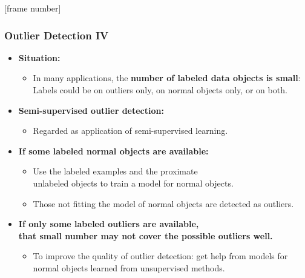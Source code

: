 \documentclass[aspectratio=169,t,xcolor=dvipsnames]{beamer}
\begin{document}
{
[frame number]
\begin{frame}
	\frametitle{Outlier Detection IV}
	\begin{itemize}
		\item \textbf{Situation:}
		      \begin{itemize}
		      	\item In many applications, the \textbf{\color{airforceblue}number of labeled data objects is small}:\\
            Labels could be on outliers only, on normal objects only, or on both.
		      \end{itemize}
		\item \textbf{Semi-supervised outlier detection:}
		      \begin{itemize}
		      	\item Regarded as application of semi-supervised learning.
		      \end{itemize}
		\item \textbf{If some {\color{airforceblue}labeled normal objects} are available:}
		      \begin{itemize}
		      	\item Use the labeled examples and the proximate \\
            unlabeled objects to train a model for normal objects.
		      	\item Those not fitting the model of normal objects are detected as outliers.
		      \end{itemize}
		\item \textbf{If only some {\color{airforceblue}labeled outliers} are available, \\ that small number may not cover the possible outliers well.}
		      \begin{itemize}
		      	\item To improve the quality of outlier detection: get help from models for normal objects learned from unsupervised methods.
		      \end{itemize}
	\end{itemize}
\end{frame}
}
\end{document}

